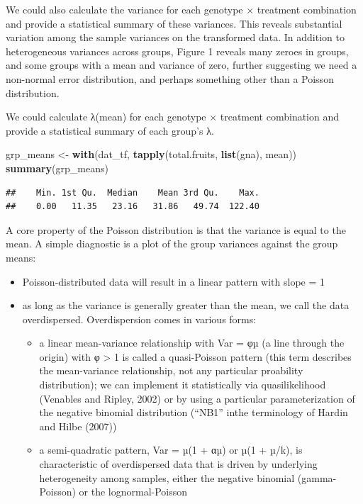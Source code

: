 \documentclass[
  12pt,
]{book}
\newenvironment{Shaded}{\begin{snugshade}}{\end{snugshade}}
\newcommand{\KeywordTok}[1]{\textcolor[rgb]{0.13,0.29,0.53}{\textbf{#1}}}
\newcommand{\NormalTok}[1]{#1}
\newcommand{\StringTok}[1]{\textcolor[rgb]{0.31,0.60,0.02}{#1}}
\providecommand{\tightlist}{%
  \setlength{\itemsep}{0pt}\setlength{\parskip}{0pt}}
\begin{document}
We could also calculate the variance for each genotype × treatment combination and provide a statistical summary of these variances.
This reveals substantial variation among the sample variances on the transformed data. In addition to heterogeneous variances across groups, Figure 1 reveals many zeroes in groups, and some groups with a mean and variance of zero, further suggesting we need a non-normal error distribution, and perhaps something other than a Poisson distribution.

We could calculate λ(mean) for each genotype × treatment combination and provide a statistical summary of each group's λ.

\begin{Shaded}
\begin{Highlighting}[]
\NormalTok{grp\_means \textless{}{-}}\StringTok{ }\KeywordTok{with}\NormalTok{(dat\_tf, }\KeywordTok{tapply}\NormalTok{(total.fruits, }\KeywordTok{list}\NormalTok{(gna), mean))}
\KeywordTok{summary}\NormalTok{(grp\_means)}
\end{Highlighting}
\end{Shaded}

\begin{verbatim}
##    Min. 1st Qu.  Median    Mean 3rd Qu.    Max. 
##    0.00   11.35   23.16   31.86   49.74  122.40
\end{verbatim}

A core property of the Poisson distribution is that the variance is equal to the mean. A simple diagnostic is a plot of the group variances against the group means:

\begin{itemize}
\tightlist
\item
  Poisson-distributed data will result in a linear pattern with slope = 1
\item
  as long as the variance is generally greater than the mean, we call the data overdispersed. Overdispersion comes in various forms:

  \begin{itemize}
  \tightlist
  \item
    a linear mean-variance relationship with Var = φµ (a line through the origin) with φ \textgreater{} 1 is called a quasi-Poisson pattern (this term describes the mean-variance relationship, not any particular proability distribution); we can implement it statistically via quasilikelihood (Venables and Ripley, 2002) or by using a particular parameterization of the negative binomial distribution (``NB1'' inthe terminology of Hardin and Hilbe (2007))
  \item
    a semi-quadratic pattern, Var = µ(1 + αµ) or µ(1 + µ/k), is characteristic of overdispersed data that is driven by underlying heterogeneity among samples, either the negative binomial (gamma-Poisson) or the lognormal-Poisson \citep{elston2001}
  \end{itemize}
\end{itemize}
\end{document}
